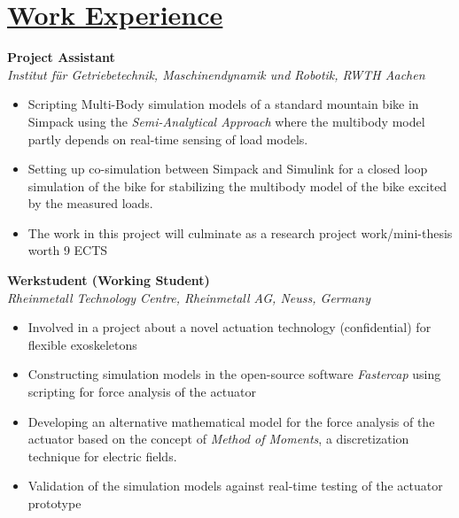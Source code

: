 
\section{\underline{Work Experience}}
\large{\textbf{Project Assistant}}
\hfill
\minithesisdate\\
\emph{\large{Institut für Getriebetechnik, Maschinendynamik und Robotik, RWTH Aachen}}
\begin{itemize}
\item \large{Scripting Multi-Body simulation models of a standard mountain bike in Simpack using the \emph{Semi-Analytical Approach} where the multibody model partly depends on real-time sensing of load models.}
\item\large{Setting up co-simulation between Simpack and Simulink for a closed loop simulation of the bike for stabilizing the multibody model of the bike excited by the measured loads.}
\item\large{The work in this project will culminate as a research project work/mini-thesis worth 9 ECTS}
\end{itemize}

\vspace{0.1 in}

\large{\textbf{Werkstudent (Working Student)}}
\hfill
\rheinmetalldate\\
\large{\emph{Rheinmetall Technology Centre, Rheinmetall AG, Neuss, Germany}}
\begin{itemize}
\item\large{Involved in a project about a novel actuation technology (confidential) for flexible exoskeletons}
\item\large{Constructing simulation models in the open-source software \emph{Fastercap} using scripting for force analysis of the actuator}
\item\large{Developing an alternative mathematical model for the force analysis of the actuator based on the concept of \emph{Method of Moments}, a discretization technique for electric fields.}
\item\large{Validation of the simulation models against real-time testing of the actuator prototype}
\end{itemize}

\vspace{0.1 in}

